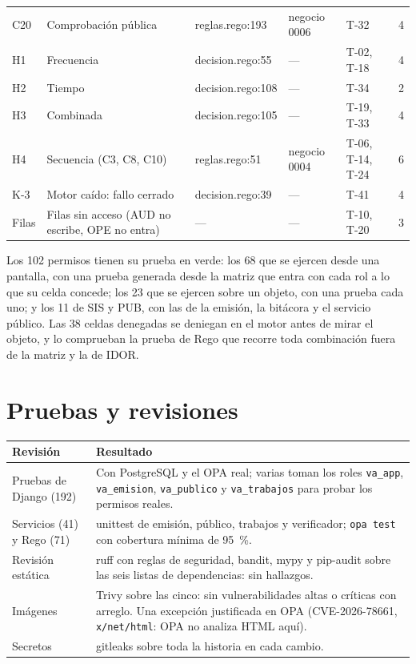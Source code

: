 \documentclass[11pt,letterpaper]{article}
\newcommand{\cab}[1]{\textbf{\rmfamily #1}}
\newcommand{\cod}[1]{\texttt{\small #1}}
\begin{document}
\begin{center}
\begin{longtable}{@{}p{1.0cm} p{4.6cm} p{2.4cm} p{2.7cm} p{2.9cm} p{1.2cm}@{}}
C20 & Comprobación pública & reglas.rego:193 & negocio 0006 & T-32 & 4  \\
H1 & Frecuencia & decision.rego:55 & — & T-02, T-18 & 4  \\
H2 & Tiempo & decision.rego:108 & — & T-34 & 2  \\
H3 & Combinada & decision.rego:105 & — & T-19, T-33 & 4  \\
H4 & Secuencia (C3, C8, C10) & reglas.rego:51 & negocio 0004 & T-06, T-14, T-24 & 6  \\
K-3 & Motor caído: fallo cerrado & decision.rego:39 & — & T-41 & 4  \\
Filas & Filas sin acceso (AUD no escribe, OPE no entra) & — & — & T-10, T-20 & 3  \\
\bottomrule
\end{longtable}
\end{center}

Los 102 permisos tienen su prueba en verde: los 68 que se ejercen desde una pantalla, con una prueba generada desde la matriz que entra con cada rol a lo que su celda concede; los 23 que se ejercen sobre un objeto, con una prueba cada uno; y los 11 de SIS y PUB, con las de la emisión, la bitácora y el servicio público. Las 38 celdas denegadas se deniegan en el motor antes de mirar el objeto, y lo comprueban la prueba de Rego que recorre toda combinación fuera de la matriz y la de IDOR.

\section{Pruebas y revisiones}\label{sec:pruebas}

\begin{center}
\footnotesize
\begin{tabularx}{\textwidth}{@{}L{4.2cm} Y@{}}
\toprule
\cab{Revisión} & \cab{Resultado} \\
\midrule
Pruebas de Django (192) & Con PostgreSQL y el OPA real; varias toman los roles \cod{va\_app}, \cod{va\_emision}, \cod{va\_publico} y \cod{va\_trabajos} para probar los permisos reales. \\
Servicios (41) y Rego (71) & unittest de emisión, público, trabajos y verificador; \cod{opa test} con cobertura mínima de 95~\%. \\
Revisión estática & ruff con reglas de seguridad, bandit, mypy y pip-audit sobre las seis listas de dependencias: sin hallazgos. \\
Imágenes & Trivy sobre las cinco: sin vulnerabilidades altas o críticas con arreglo. Una excepción justificada en OPA (CVE-2026-78661, \cod{x/net/html}: OPA no analiza HTML aquí). \\
Secretos & gitleaks sobre toda la historia en cada cambio. \\
\bottomrule
\end{tabularx}
\end{center}
\end{document}
